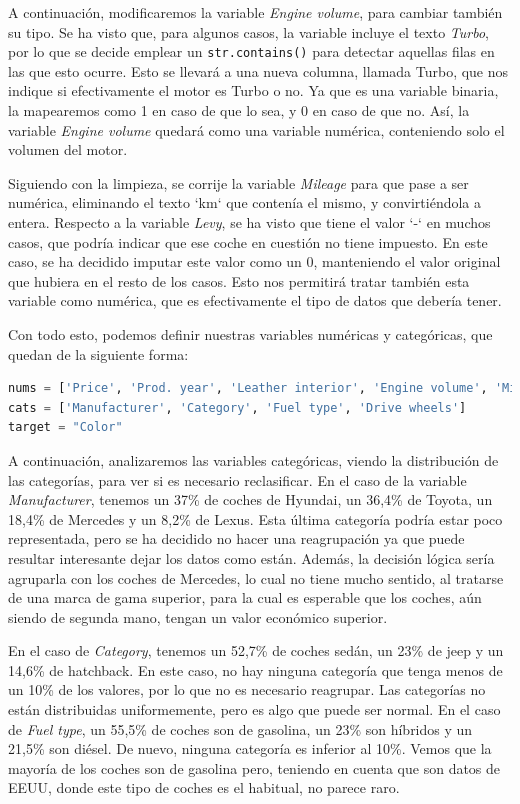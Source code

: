 \documentclass[a4paper,onecolumn]{extarticle}
\begin{document}
\begin{sloppypar}
A continuación, modificaremos la variable \textit{Engine volume}, para cambiar también su tipo. Se ha visto que, para algunos casos, la variable incluye el texto 
\textit{Turbo}, por lo que se decide emplear un \texttt{str.contains()} para detectar aquellas filas en las que esto ocurre. Esto se llevará a una nueva columna, 
llamada Turbo, que nos indique si efectivamente el motor es Turbo o no. Ya que es una variable binaria, la mapearemos como 1 en caso de que lo sea, y 0 en caso
de que no. Así, la variable \textit{Engine volume} quedará como una variable numérica, conteniendo solo el volumen del motor.

Siguiendo con la limpieza, se corrije la variable \textit{Mileage} para que pase a ser numérica, eliminando el texto `km` que contenía el mismo, y convirtiéndola 
a entera. Respecto a la variable \textit{Levy}, se ha visto que tiene el valor `-` en muchos casos, que podría indicar que ese coche en cuestión no tiene impuesto. 
En este caso, se ha decidido imputar este valor como un 0, manteniendo el valor original que hubiera en el resto de los casos. Esto nos permitirá tratar también 
esta variable como numérica, que es efectivamente el tipo de datos que debería tener. 

Con todo esto, podemos definir nuestras variables numéricas y categóricas, que quedan de la siguiente forma:
\begin{lstlisting}[language=Python,numbers=none]
nums = ['Price', 'Prod. year', 'Leather interior', 'Engine volume', 'Mileage', 'Airbags', 'Cylinders', 'Right wheel', 'Automatic', 'Turbo', 'Levy']
cats = ['Manufacturer', 'Category', 'Fuel type', 'Drive wheels']
target = "Color"
\end{lstlisting}

A continuación, analizaremos las variables categóricas, viendo la distribución de las categorías, para ver si es necesario reclasificar. En el caso de la variable 
\textit{Manufacturer}, tenemos un 37\% de coches de Hyundai, un 36,4\% de Toyota, un 18,4\% de Mercedes y un 8,2\% de Lexus. Esta última categoría podría estar 
poco representada, pero se ha decidido no hacer una reagrupación ya que puede resultar interesante dejar los datos como están. Además, la decisión lógica sería 
agruparla con los coches de Mercedes, lo cual no tiene mucho sentido, al tratarse de una marca de gama superior, para la cual es esperable que los coches, aún 
siendo de segunda mano, tengan un valor económico superior.

En el caso de \textit{Category}, tenemos un 52,7\% de coches sedán, un 23\% de jeep y un 14,6\% de hatchback. En este caso, no hay ninguna categoría que 
tenga menos de un 10\% de los valores, por lo que no es necesario reagrupar. Las categorías no están distribuidas uniformemente, pero es algo que puede ser normal.
En el caso de \textit{Fuel type}, un 55,5\% de coches son de gasolina, un 23\% son híbridos y un 21,5\% son diésel. De nuevo, ninguna categoría es inferior al 
10\%. Vemos que la mayoría de los coches son de gasolina pero, teniendo en cuenta que son datos de EEUU, donde este tipo de coches es el habitual, no parece raro.


\end{sloppypar}
\end{document}
